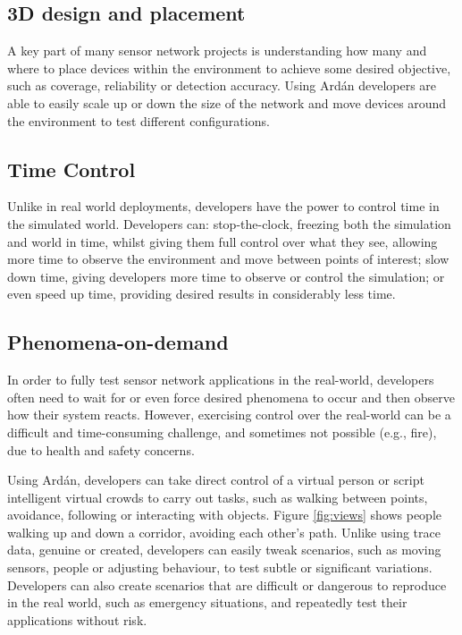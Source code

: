 \subsection{3D design and placement}
\label{sub:3D design and placement}
A key part of many sensor network projects is understanding how many and where to place devices within the environment to achieve some desired objective, such as coverage, reliability or detection accuracy. Using Ard\'{a}n developers are able to easily scale up or down the size of the network and move devices around the environment to test different configurations.

\subsection{Time Control}
\label{sub:Time Control}
Unlike in real world deployments, developers have the power to control time in the simulated world. Developers can: stop-the-clock, freezing both the simulation and world in time, whilst giving them full control over what they see, allowing more time to observe the environment and move between points of interest; slow down time, giving developers more time to observe or control the simulation; or even speed up time, providing desired results in considerably less time.

\subsection{Phenomena-on-demand}
\label{sub:Phenomena-on-demand}
In order to fully test sensor network applications in the real-world, developers often need to wait for or even force desired phenomena to occur and then observe how their system reacts. However, exercising control over the real-world can be a difficult and time-consuming challenge, and sometimes not possible (e.g., fire), due to health and safety concerns.

Using Ard\'{a}n, developers can take direct control of a virtual person or script intelligent virtual crowds to carry out tasks, such as walking between points, avoidance, following or interacting with objects. Figure \ref{fig:views} shows people walking up and down a corridor, avoiding each other's path. Unlike using trace data, genuine or created, developers can easily tweak scenarios, such as moving sensors, people or adjusting behaviour, to test subtle or significant variations. Developers can also create scenarios that are difficult or dangerous to reproduce in the real world, such as emergency situations, and repeatedly test their applications without risk.

